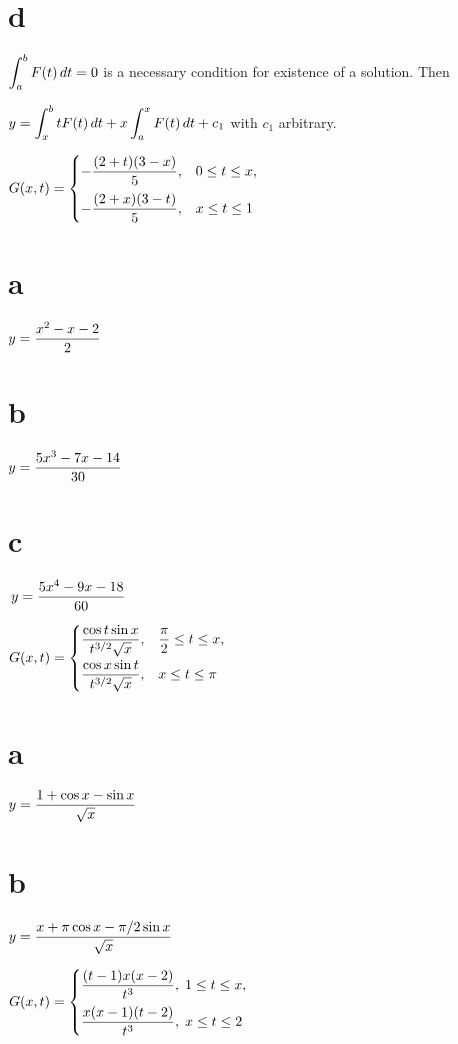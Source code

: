 \smallskip
\quad\;
\part{d}\;
$\displaystyle{\int_{a}^{b}F(t)\,dt=0}$ is a necessary condition for existence of a
solution. Then

\quad  \qquad  \qquad
      $y=\displaystyle{\int_{x}^{b}tF(t)\,dt+x\int_{a}^{x}F(t)\,dt+c_{1}}$
with $c_{1}$ arbitrary.

\smallskip
{}
$G(x,t)=
\begin{cases}
\displaystyle{-\frac{(2+t)(3-x)}{5}},&0\le t\le x,\\[.11in]
-\displaystyle{\frac{(2+x)(3-t)}{5}},&x\le t\le1
\end{cases}$
\;  \part{a} $y=\displaystyle{\frac{x^{2}-x-2}{2}}$
\;  \part{b} $y=\displaystyle{\frac{5x^{3}-7x-14}{30}}$

\medskip
\quad \quad
\part{c}$\,y=\displaystyle{\frac{5x^{4}-9x-18}{60}}$

\smallskip
{}
$G(x,t)=
\begin{cases}
\displaystyle{\frac{\cos t\sin x}{t^{3/2}\sqrt{x}}},&\displaystyle{\frac{\pi}{2}}\le t\le
x,\\[.11in]
\displaystyle{\frac{\cos x\sin t}{t^{3/2}\sqrt{x}}},&x\le t\le\pi
\end{cases}$

\smallskip
\quad \quad
\;  \part{a}\;   $y=\displaystyle{\frac{1+\cos x-\sin x}{\sqrt{x}}}$
\;  \part{b}\;   $y=\displaystyle{\frac{x+\pi\cos x-\pi/2\sin x}{\sqrt{x}}}$

\smallskip
{}
$G(x,t)=
\begin{cases}
\displaystyle{\frac{(t-1)x(x-2)}{t^{3}}},\;1\le t\le x,\\[.11in]
\displaystyle{\frac{x(x-1)(t-2)}{t^{3}}},\;x\le t\le2
\end{cases}$

